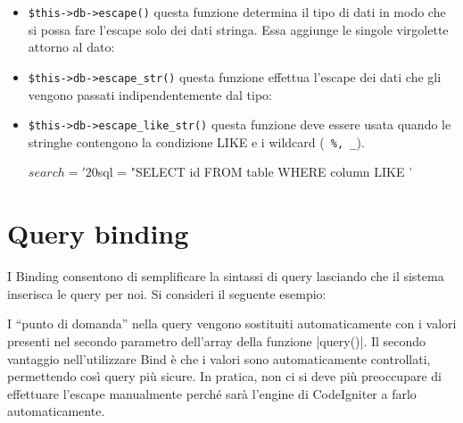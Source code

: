 \begin{itemize}
\item \verb|$this->db->escape()| questa funzione determina il tipo di dati in modo che si possa fare l'escape solo dei dati stringa. Essa aggiunge le singole virgolette attorno al dato:


\item \verb|$this->db->escape_str()| questa funzione effettua l'escape dei dati che gli vengono passati indipendentemente dal tipo:


\item \verb|$this->db->escape_like_str()| questa funzione deve essere usata quando le stringhe contengono la condizione LIKE e i wildcard (\verb| %, _|).

\begin{code}
$search = '20%
$sql = "SELECT id FROM table WHERE column LIKE '%
\end{code}
\end{itemize}

\section*{Query binding}
I Binding consentono di semplificare la sintassi di query lasciando che il sistema inserisca le query per noi. Si consideri il seguente esempio:


I ``punto di domanda'' nella query vengono sostituiti automaticamente con i valori presenti nel secondo parametro dell'array della funzione \var|query()|. Il secondo vantaggio nell'utilizzare Bind è che i valori sono automaticamente controllati, permettendo così query più sicure. In pratica, non ci si deve più preoccupare di effettuare l'escape manualmente perché sarà l'engine di CodeIgniter a farlo automaticamente.
